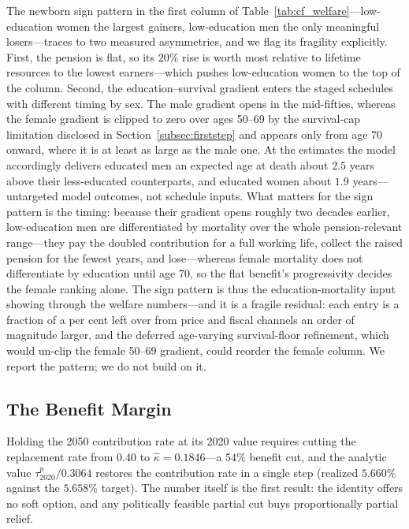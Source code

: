 \documentclass[12pt,a4paper]{article}
\begin{document}
The newborn sign pattern in the first column of Table~\ref{tab:cf_welfare}---low-education women the largest gainers, low-education men the only meaningful losers---traces to two measured asymmetries, and we flag its fragility explicitly. First, the pension is flat, so its $20\%$ rise is worth most relative to lifetime resources to the lowest earners---which pushes low-education women to the top of the column. Second, the education--survival gradient enters the staged schedules with different timing by sex. The male gradient opens in the mid-fifties, whereas the female gradient is clipped to zero over ages 50--69 by the survival-cap limitation disclosed in Section~\ref{subsec:firststep} and appears only from age 70 onward, where it is at least as large as the male one. At the estimates the model accordingly delivers educated men an expected age at death about $2.5$ years above their less-educated counterparts, and educated women about $1.9$ years---untargeted model outcomes, not schedule inputs. What matters for the sign pattern is the timing: because their gradient opens roughly two decades earlier, low-education men are differentiated by mortality over the whole pension-relevant range---they pay the doubled contribution for a full working life, collect the raised pension for the fewest years, and lose---whereas female mortality does not differentiate by education until age 70, so the flat benefit's progressivity decides the female ranking alone. The sign pattern is thus the education-mortality input showing through the welfare numbers---and it is a fragile residual: each entry is a fraction of a per cent left over from price and fiscal channels an order of magnitude larger, and the deferred age-varying survival-floor refinement, which would un-clip the female 50--69 gradient, could reorder the female column. We report the pattern; we do not build on it.

\subsection{The Benefit Margin}
\label{subsec:exp_kappa_taum}

Holding the 2050 contribution rate at its 2020 value requires cutting the replacement rate from $0.40$ to $\widehat\kappa=0.1846$---a $54\%$ benefit cut, and the analytic value $\tau^p_{2020}/0.3064$ restores the contribution rate in a single step (realized $5.660\%$ against the $5.658\%$ target). The number itself is the first result: the identity offers no soft option, and any politically feasible partial cut buys proportionally partial relief.
\end{document}
